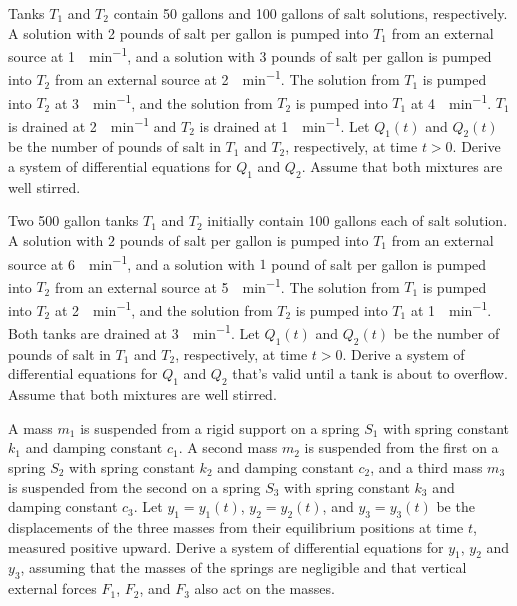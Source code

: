 \exercises

\begin{exerciselist}

\item\label{exer:10.1.1}Tanks $T_1$ and $T_2$ contain 50 gallons and 100 gallons of salt
solutions, respectively. A solution with 2 pounds of salt per gallon
is pumped into $T_1$ from an external source at \qty{1}{\gallon\per\minute}, and a
solution with $3$ pounds of salt per gallon is pumped into $T_2$ from an
external source at \qty{2}{\gallon\per\minute}. The solution from $T_1$ is pumped into
$T_2$ at \qty{3}{\gallon\per\minute}, and the solution from $T_2$ is pumped into $T_1$
at \qty{4}{\gallon\per\minute}. $T_1$ is drained at \qty{2}{\gallon\per\minute} and $T_2$ is drained at
\qty{1}{\gallon\per\minute}. Let $Q_1(t)$ and $Q_2(t)$ be the number of pounds of salt
in $T_1$ and $T_2$, respectively, at time $t>0$. Derive a system of
differential equations for $Q_1$ and $Q_2$. Assume that both mixtures
are well stirred.


\item\label{exer:10.1.2}Two 500 gallon tanks $T_1$ and $T_2$ initially contain 100
gallons each of salt solution. A solution with $2$ pounds of salt per
gallon is pumped into $T_1$ from an external source at \qty{6}{\gallon\per\minute}, and
a solution with $1$ pound of salt per gallon is pumped into $T_2$ from
an external source at \qty{5}{\gallon\per\minute}. The solution from $T_1$ is pumped
into $T_2$ at \qty{2}{\gallon\per\minute}, and the solution from $T_2$ is pumped into
$T_1$ at \qty{1}{\gallon\per\minute}. Both tanks are drained at \qty{3}{\gallon\per\minute}. Let $Q_1(t)$
and $Q_2(t)$ be the number of pounds of salt in $T_1$ and $T_2$,
respectively, at time $t>0$. Derive a system of differential equations
for $Q_1$ and $Q_2$ that's valid until a tank is about to overflow.
Assume that both mixtures are well stirred.

\item\label{exer:10.1.3}A mass $m_1$ is suspended from a rigid support on a spring $S_1$ with
spring constant $k_1$ and damping constant $c_1$. A second mass $m_2$
is suspended from the first on a spring $S_2$ with spring constant
$k_2$ and damping constant $c_2$, and a third mass $m_3$ is suspended
from the second on a spring $S_3$ with spring constant $k_3$ and
damping
constant $c_3$. Let $y_1=y_1(t)$, $y_2=y_2(t)$, and $y_3=y_3(t)$ be the
displacements of the three masses from their equilibrium positions at
time $t$, measured positive upward. Derive a system of differential
equations for $y_1$, $y_2$ and $y_3$, assuming that the masses of the
springs are negligible and that vertical external forces $F_1$, $F_2$,
and
$F_3$ also act on the masses.


\end{exerciselist}
